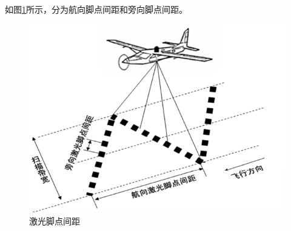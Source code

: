 如图\ref{fig:激光脚点间距}所示，分为航向脚点间距和旁向脚点间距。
\begin{figure}[htbp]
	\centering
	\includegraphics[width=0.7\linewidth]{figure/Chapter4/激光脚点间距}
	\caption{激光脚点间距}
	\label{fig:激光脚点间距}
\end{figure}

